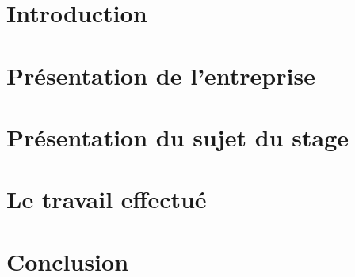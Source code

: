 \documentclass[a4paper,french,12pt]{report}
\begin{document}
\chapter{Introduction}


\chapter{Présentation de l'entreprise}


\chapter{Présentation du sujet du stage}


\chapter{Le travail effectué}


\chapter{Conclusion}

\end{document}
